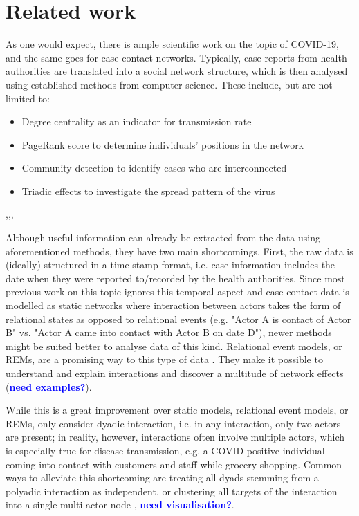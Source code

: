 \documentclass{article}
\newcommand{\add}[1]{\textbf{\textcolor{blue}{#1}}}
\begin{document}
	\section{Related work}
	\label{sec:Related_work}
	As one would expect, there is ample scientific work on the topic of COVID-19, and the same goes for case contact networks. Typically, case reports from health authorities are translated into a social network structure, which is then analysed using established methods from computer science. These include, but are not limited to:
	\begin{itemize}
		\item Degree centrality as an indicator for transmission rate
		\item PageRank score to determine individuals' positions in the network
		\item Community detection to identify cases who are interconnected
		\item Triadic effects to investigate the spread pattern of the virus
	\end{itemize}\cite{hainan_publication},\cite{luo2021construction},\cite{network_tunisia},\cite{shanxi_publication}
	
	Although useful information can already be extracted from the data using aforementioned methods, they have two main shortcomings. First, the raw data is (ideally) structured in a time-stamp format, i.e. case information includes the date when they were reported to/recorded by the health authorities. Since most previous work on this topic ignores this temporal aspect and case contact data is modelled as static networks where interaction between actors takes the form of relational states as opposed to relational events (e.g. "Actor A is contact of Actor B" vs. "Actor A came into contact with Actor B on date D"), newer methods might be suited better to analyse data of this kind. Relational event models, or REMs, are a promising way to this type of data \cite{perry2013point}. They make it possible to understand and explain interactions and discover a multitude of network effects (\add{need examples?}). 
	
	While this is a great improvement over static models, relational event models, or REMs, only consider dyadic interaction, i.e. in any interaction, only two actors are present; in reality, however, interactions often involve multiple actors, which is especially true for disease transmission, e.g. a COVID-positive individual coming into contact with customers and staff while grocery shopping. Common ways to alleviate this shortcoming are treating all dyads stemming from a polyadic interaction as independent, or clustering all targets of the interaction into a single multi-actor node \cite{butts20084},\cite{perry2013point} \add{need visualisation?}.
	
\end{document}
